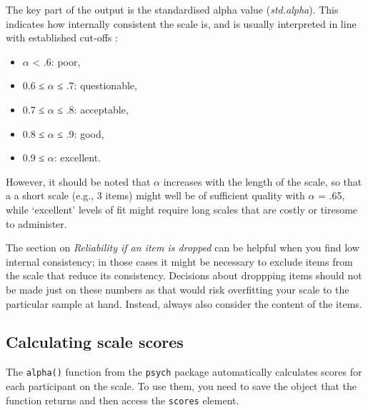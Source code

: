 \documentclass[
]{book}
\newenvironment{Shaded}{\begin{snugshade}}{\end{snugshade}}
\newcommand{\CommentTok}[1]{\textcolor[rgb]{0.56,0.35,0.01}{\textit{#1}}}
\newcommand{\KeywordTok}[1]{\textcolor[rgb]{0.13,0.29,0.53}{\textbf{#1}}}
\newcommand{\NormalTok}[1]{#1}
\newcommand{\OperatorTok}[1]{\textcolor[rgb]{0.81,0.36,0.00}{\textbf{#1}}}
\newcommand{\StringTok}[1]{\textcolor[rgb]{0.31,0.60,0.02}{#1}}
\providecommand{\tightlist}{%
  \setlength{\itemsep}{0pt}\setlength{\parskip}{0pt}}
\begin{document}
The key part of the output is the standardised alpha value (\emph{std.alpha}). This indicates how internally consistent the scale is, and is usually interpreted in line with established cut-offs \citep{devellis2016scale}:

\begin{itemize}
\tightlist
\item
  \(\alpha\) \textless{} .6: poor,\\
\item
  0.6 ≤ \(\alpha\) ≤ .7: questionable,
\item
  0.7 ≤ \(\alpha\) ≤ .8: acceptable,
\item
  0.8 ≤ \(\alpha\) ≤ .9: good,
\item
  0.9 ≤ \(\alpha\): excellent.
\end{itemize}

However, it should be noted that \(\alpha\) increases with the length of the scale, so that a a short scale (e.g., 3 items) might well be of sufficient quality with \(\alpha\) = .65, while `excellent' levels of fit might require long scales that are costly or tiresome to administer.

The section on \emph{Reliability if an item is dropped} can be helpful when you find low internal consistency; in those cases it might be necessary to exclude items from the scale that reduce its consistency. Decisions about droppping items should not be made just on these numbers as that would risk overfitting your scale to the particular sample at hand. Instead, always also consider the content of the items.

\hypertarget{calculating-scale-scores}{%
\subsection{Calculating scale scores}\label{calculating-scale-scores}}

The \texttt{alpha()} function from the \texttt{psych} package automatically calculates scores for each participant on the scale. To use them, you need to save the object that the function returns and then access the \texttt{scores} element.

\begin{Shaded}
\end{Shaded}
\end{document}
